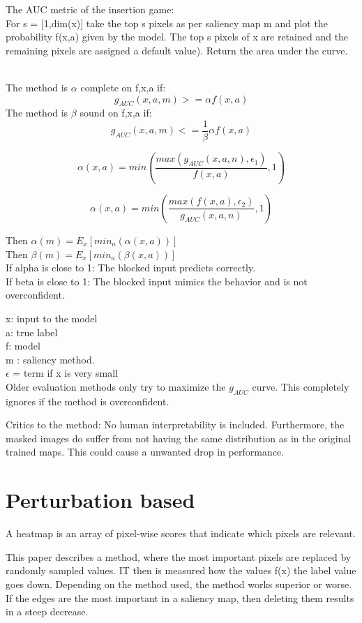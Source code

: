 The AUC metric \cite{petsiuk2018rise} of the insertion game:\\
For s = [1,dim(x)] take the top s pixels as per saliency map m and plot the probability f(x,a) given by the model. The top s pixels of x are retained and the  remaining pixels are assigned a default value). Return the area under the curve.\\\

The method is $\alpha$ complete on f,x,a if:
$$ g_{AUC} (x,a,m) >= \alpha f(x,a)$$
The method is $\beta$ sound on f,x,a if:
$$ g_{AUC} (x,a,m) <= \frac{1}{\beta}\alpha f(x,a)$$

$$\alpha(x,a) = min(\frac{max(g_{AUC}(x,a,n),\epsilon_1)}{f(x,a)},1)$$

$$\alpha(x,a)=min(\frac{max(f(x,a),\epsilon_2)}{g_{AUC}(x,a,n)},1)$$

Then $\alpha(m) = E_x[min_a(\alpha(x,a))]$\\
Then $\beta(m) = E_x[min_a(\beta(x,a))]$\\

If alpha is close to 1: The blocked input predicts correctly. \\ If beta is close to 1: The blocked input mimics the behavior and is not overconfident.

x: input to the model \\
a: true label \\
f: model\\
m : saliency method.\\
$\epsilon$ = term if x is very small\\

Older evaluation methods only try to maximize the $g_{AUC}$ curve. This completely ignores if the method is overconfident.


Critics to the method: No human interpretability is included. Furthermore, the masked images do suffer from not having the same distribution as in the original trained maps. This could cause a unwanted drop in performance.

\section{Perturbation based \cite{7552539}}

A heatmap is an array of pixel-wise scores that indicate which pixels are relevant.

This paper describes a method, where the most important pixels are replaced by randomly sampled values. IT then is measured how the values f(x) the label value goes down. Depending on the method used, the method works superior or worse. If the edges are the most important in a saliency map, then deleting them results in a steep decrease.

